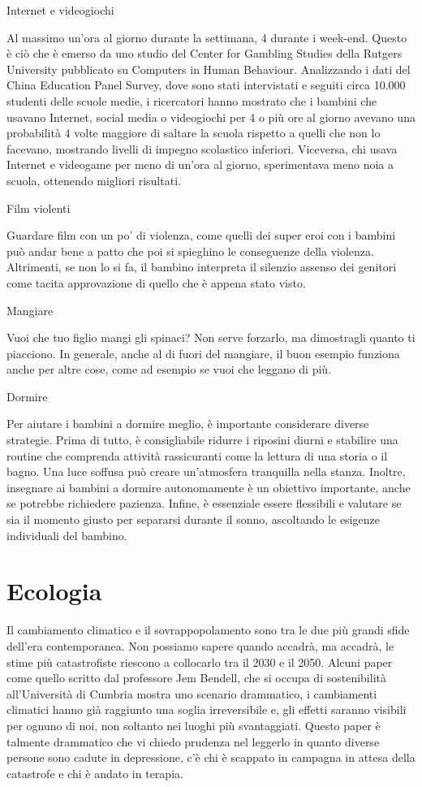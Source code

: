 \documentclass[12pt]{book} %
\begin{document}
Internet e videogiochi

Al massimo un'ora al giorno durante la settimana, 4 durante i week-end. Questo è ciò che è emerso da uno studio del
Center for Gambling Studies della Rutgers University pubblicato su Computers in Human Behaviour. Analizzando i dati del
China Education Panel Survey, dove sono stati intervistati e seguiti circa 10.000 studenti delle scuole medie, i
ricercatori hanno mostrato che i bambini che usavano Internet, social media o videogiochi per 4 o più ore al giorno
avevano una probabilità 4 volte maggiore di saltare la scuola rispetto a quelli che non lo facevano, mostrando livelli
di impegno scolastico inferiori. Viceversa, chi usava Internet e videogame per meno di un'ora al giorno, sperimentava
meno noia a scuola, ottenendo migliori risultati. 

Film violenti

Guardare film con un po' di violenza, come quelli dei super eroi con i bambini può andar bene a patto che poi si
spieghino le conseguenze della violenza. Altrimenti, se non lo si fa, il bambino interpreta il silenzio assenso dei
genitori come tacita approvazione di quello che è appena stato visto.

Mangiare

Vuoi che tuo figlio mangi gli spinaci? Non serve forzarlo, ma dimostragli quanto ti piacciono. In generale, anche al di
fuori del mangiare, il buon esempio funziona anche per altre cose, come ad esempio se vuoi che leggano di più.

Dormire

Per aiutare i bambini a dormire meglio, è importante considerare diverse strategie. Prima di tutto, è consigliabile
ridurre i riposini diurni e stabilire una routine che comprenda attività rassicuranti come la lettura di una storia o
il bagno. Una luce soffusa può creare un'atmosfera tranquilla nella stanza. Inoltre, insegnare ai bambini a dormire
autonomamente è un obiettivo importante, anche se potrebbe richiedere pazienza. Infine, è essenziale essere flessibili
e valutare se sia il momento giusto per separarsi durante il sonno, ascoltando le esigenze individuali del bambino.

\clearpage\section{Ecologia}
Il cambiamento climatico e il sovrappopolamento sono tra le due più grandi sfide dell'era
contemporanea. Non possiamo sapere quando accadrà, ma accadrà, le stime più catastrofiste riescono a collocarlo tra il
2030 e il 2050. Alcuni paper come quello scritto dal professore Jem Bendell, che si occupa di sostenibilità
all'Università di
Cumbria mostra
uno scenario drammatico, i cambiamenti climatici hanno già raggiunto una soglia irreversibile e, gli effetti saranno
visibili per ognuno di noi, non soltanto nei luoghi più svantaggiati. Questo paper è talmente drammatico che vi chiedo
prudenza nel leggerlo in quanto diverse persone sono cadute in depressione, c'è chi è scappato in
campagna in attesa della catastrofe e chi è andato in terapia.
\end{document}
